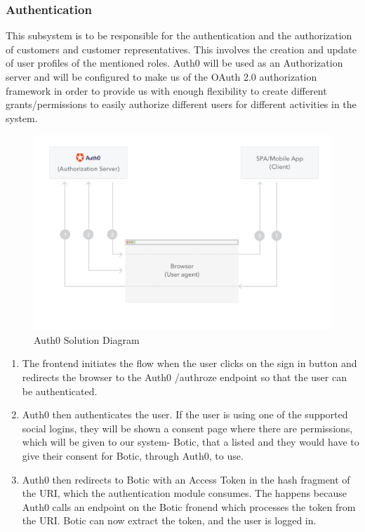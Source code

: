 \documentclass[11pt]{article}
\begin{document}
\subsubsection{Authentication}

This subsystem is to be responsible for the authentication and the authorization of customers and customer representatives. This involves the creation and update of user profiles of the mentioned roles. Auth0 will be used as an Authorization server and will be configured to make us of the OAuth 2.0 authorization framework in order to provide us with enough flexibility to create different grants/permissions to easily authorize different users for different activities in the system.

\begin{figure}[H]
	\centering
	\includegraphics[width=1.0\textwidth]{../../images/implicit-grant.png}
	\caption{Auth0 Solution Diagram\cite{Website:1}}
\end{figure}

\begin{enumerate}
	\item The frontend initiates the flow when the user clicks on the sign in button and redirects the browser to the Auth0 			/authroze endpoint so that the user can be authenticated.
	\item Auth0 then authenticates the user. If the user is using one of the supported social logins, they will be shown a 			consent page where there are permissions, which will be given to our system- Botic, that a listed and they would have to 		give their consent for Botic, through Auth0, to use.
	\item Auth0 then redirects to Botic with an Access Token in the hash fragment of the URI, which the authentication 			module consumes. The happens because Auth0 calls an endpoint on the Botic fronend which processes the token from the 	URI. Botic can now extract the token, and the user is logged in.\cite{Website:1}
\end{enumerate}
\end{document}
